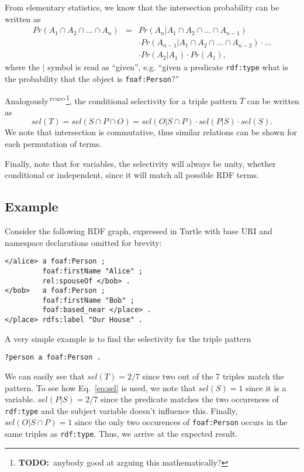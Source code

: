 \documentclass[12pt, draft]{article}
\newcommand{\rdfterm}[1]{\texttt{#1}}
\newcommand{\todo}[1]{\ensuremath{^{\textrm{\tiny{TODO}\normalsize}}}\footnote{\textbf{TODO:}~#1}}
\begin{document}
From elementary statistics, we know that the intersection probability
can be written as
\begin{eqnarray}
Pr(A_1 \cap A_2  \cap \ldots \cap A_n) &=& 
  Pr(A_n | A_1 \cap A_2  \cap \ldots \cap A_{n-1}) \nonumber\\
  &&\cdot Pr(A_{n-1} | A_1 \cap A_2  \cap \ldots \cap A_{n-2}) \cdot \ldots \nonumber\\
  && \cdot Pr(A_2 | A_1) \cdot Pr(A_1) ,
\end{eqnarray}
where the $|$ symbol is read as ``given'', e.g. ``given a predicate
\rdfterm{rdf:type} what is the probability that the object is \rdfterm{foaf:Person}?''

Analogously\todo{anybody good at arguing this mathematically?}, the
conditional selectivity for a triple pattern $T$ can be written as 
\begin{equation}\label{eq:sel}
sel(T) = sel(S \cap P \cap O) = sel(O | S \cap P) \cdot sel(P | S)
\cdot sel(S) . 
\end{equation}
We note that intersection is commutative, thus similar
relations can be shown for each permutation of terms.

Finally, note that for variables, the selectivity will always be
unity, whether conditional or independent, since it will match all
possible RDF terms.

\subsection{Example}

Consider the following RDF graph, expressed in Turtle with base URI
and namespace declarations omitted for brevity:

\begin{verbatim}
</alice> a foaf:Person ;
         foaf:firstName "Alice" ;
         rel:spouseOf </bob> .
</bob>   a foaf:Person ;
         foaf:firstName "Bob" ;
         foaf:based_near </place> .
</place> rdfs:label "Our House" .
\end{verbatim}

A very simple example is to find the selectivity for the triple pattern
\begin{verbatim}
?person a foaf:Person .
\end{verbatim}
We can easily see that $sel(T) = 2/7$ since two out of the 7 triples
match the pattern. To see how Eq.~\ref{eq:sel} is used, we note that
$sel(S) = 1$ since it is a variable. $sel(P | S) = 2/7$ since the
predicate matches the two occurences of \rdfterm{rdf:type} and the
subject variable doesn't influence this. Finally, $sel(O | S \cap P) =
1$ since the only two occurences of \rdfterm{foaf:Person} occurs in
the same triples as \rdfterm{rdf:type}. Thus, we arrive at the
expected result. 
\end{document}
